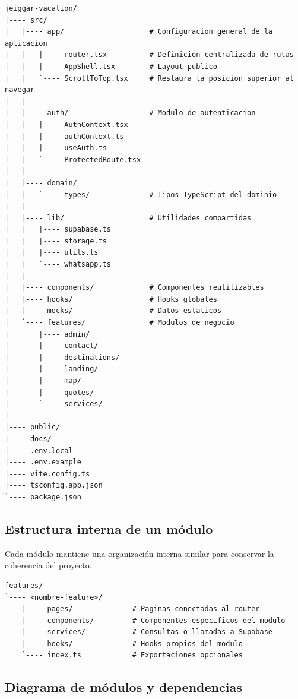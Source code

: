 \documentclass[12pt,letterpaper]{article}
\begin{document}
\makeatletter
\begin{lstlisting}[language={}]
jeiggar-vacation/
|---- src/
|   |---- app/                    # Configuracion general de la aplicacion
|   |   |---- router.tsx          # Definicion centralizada de rutas
|   |   |---- AppShell.tsx        # Layout publico
|   |   `---- ScrollToTop.tsx     # Restaura la posicion superior al navegar
|   |
|   |---- auth/                   # Modulo de autenticacion
|   |   |---- AuthContext.tsx
|   |   |---- authContext.ts
|   |   |---- useAuth.ts
|   |   `---- ProtectedRoute.tsx
|   |
|   |---- domain/
|   |   `---- types/              # Tipos TypeScript del dominio
|   |
|   |---- lib/                    # Utilidades compartidas
|   |   |---- supabase.ts
|   |   |---- storage.ts
|   |   |---- utils.ts
|   |   `---- whatsapp.ts
|   |
|   |---- components/             # Componentes reutilizables
|   |---- hooks/                  # Hooks globales
|   |---- mocks/                  # Datos estaticos
|   `---- features/               # Modulos de negocio
|       |---- admin/
|       |---- contact/
|       |---- destinations/
|       |---- landing/
|       |---- map/
|       |---- quotes/
|       `---- services/
|
|---- public/
|---- docs/
|---- .env.local
|---- .env.example
|---- vite.config.ts
|---- tsconfig.app.json
`---- package.json
\end{lstlisting}
\makeatother

\subsection{Estructura interna de un módulo}

Cada módulo mantiene una organización interna similar para conservar la coherencia del proyecto.

\begin{lstlisting}[language={}]
features/
`---- <nombre-feature>/
    |---- pages/              # Paginas conectadas al router
    |---- components/         # Componentes especificos del modulo
    |---- services/           # Consultas o llamadas a Supabase
    |---- hooks/              # Hooks propios del modulo
    `---- index.ts            # Exportaciones opcionales
\end{lstlisting}

\subsection{Diagrama de módulos y dependencias}
\end{document}
